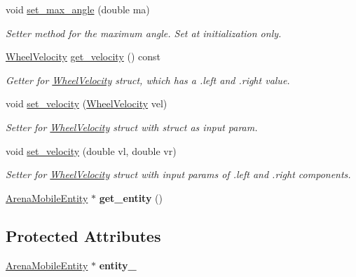 \begin{DoxyCompactItemize}
void \mbox{\hyperlink{class_motion_handler_aa73973c705626f1f95ac59391f23bcc9}{set\+\_\+max\+\_\+angle}} (double ma)
\begin{DoxyCompactList}\small\item\em Setter method for the maximum angle. Set at initialization only. \end{DoxyCompactList}\item 
\mbox{\label{class_motion_handler_abe03a52474984233d1867405925a4102}} 
\mbox{\hyperlink{struct_wheel_velocity}{Wheel\+Velocity}} \mbox{\hyperlink{class_motion_handler_abe03a52474984233d1867405925a4102}{get\+\_\+velocity}} () const
\begin{DoxyCompactList}\small\item\em Getter for \mbox{\hyperlink{struct_wheel_velocity}{Wheel\+Velocity}} struct, which has a .left and .right value. \end{DoxyCompactList}\item 
\mbox{\label{class_motion_handler_ac4bf67ba783c1afb5a5839229de3f3f9}} 
void \mbox{\hyperlink{class_motion_handler_ac4bf67ba783c1afb5a5839229de3f3f9}{set\+\_\+velocity}} (\mbox{\hyperlink{struct_wheel_velocity}{Wheel\+Velocity}} vel)
\begin{DoxyCompactList}\small\item\em Setter for \mbox{\hyperlink{struct_wheel_velocity}{Wheel\+Velocity}} struct with struct as input param. \end{DoxyCompactList}\item 
\mbox{\label{class_motion_handler_af31975aa667ca20835e4d5bb0216706e}} 
void \mbox{\hyperlink{class_motion_handler_af31975aa667ca20835e4d5bb0216706e}{set\+\_\+velocity}} (double vl, double vr)
\begin{DoxyCompactList}\small\item\em Setter for \mbox{\hyperlink{struct_wheel_velocity}{Wheel\+Velocity}} struct with input params of .left and .right components. \end{DoxyCompactList}\item 
\mbox{\label{class_motion_handler_ad8472612d15be1ada7f919f45d245adc}} 
\mbox{\hyperlink{class_arena_mobile_entity}{Arena\+Mobile\+Entity}} $\ast$ {\bfseries get\+\_\+entity} ()
\end{DoxyCompactItemize}
\subsection*{Protected Attributes}
\begin{DoxyCompactItemize}
\item 
\mbox{\label{class_motion_handler_a659fd1ec8878260a63779bf45681f5a4}} 
\mbox{\hyperlink{class_arena_mobile_entity}{Arena\+Mobile\+Entity}} $\ast$ {\bfseries entity\+\_\+}
\end{DoxyCompactItemize}


